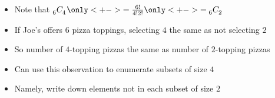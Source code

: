 \documentclass[handout]{beamer}
\theoremstyle{definition}
\newcommand\ncr[2]{\tensor[_{#1}]C{_{#2}}}
\begin{document}
\begin{frame}
\begin{multicols}{2}
\begin{itemize}
\item Note that $\ncr{6}{4}
\only<+->{=\frac{6!}{4!2!}}\only<+->{=\ncr{6}{2}}$
\item If Joe's offers $6$ pizza toppings,
selecting $4$ the same as \alert{not}
selecting $2$
\item So number of $4$-topping pizzas
the same as number of $2$-topping pizzas
\item Can use this observation to enumerate
subsets of size $4$
\item Namely,
write down elements \alert{not} in 
each subset of size $2$
\end{itemize}
\columnbreak
{}
\end{multicols}
\end{frame}
\end{document}
